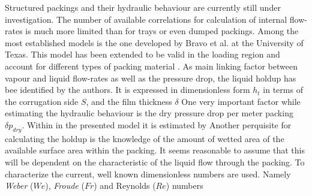         Structured packings and their hydraulic behaviour are currently still under investigation. The number
        of available correlations for calculation of internal flow-rates is much more limited than for trays or even
        dumped packings. Among the most established models is the one developed by Bravo et al. \cite{Rocha.1993} at the
        University of Texas. This model has been extended to be valid in the loading region and account for different types
        of packing material \cite{Gualito.1997}. As main linking factor between vapour and liquid flow-rates as well as
        the pressure drop, the liquid holdup has bee identified by the authors. It is expressed in dimensionless form $h_t$ in
        terms of the corrugation side $S$, and the film thickness $\delta$
        One very important factor while estimating the hydraulic behaviour is the dry pressure drop per meter packing $\delta p_{dry}$.
        Within in the presented model it is estimated by
        Another perquisite for calculating the holdup is the knowledge of the amount of wetted area of the available
        surface area within the packing. It seems reasonable to assume that this will be dependent on the characteristic
        of the liquid flow through the packing. To characterize the current, well known dimensionless numbers are
        used. Namely \emph{Weber} ($We$), \emph{Froude} ($Fr$) and Reynolds ($Re$) numbers

